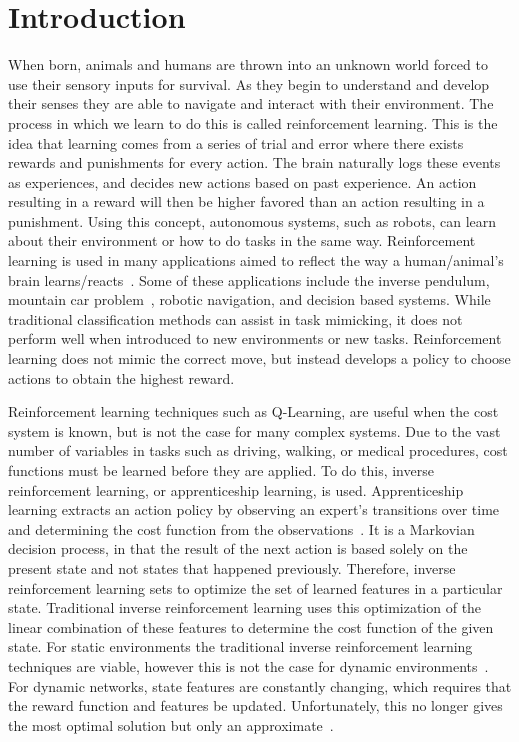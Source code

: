 \documentclass[12pt,american]{report}
\begin{document}
\chapter{Introduction}
When born, animals and humans are thrown into an unknown world forced to use their sensory inputs for survival. As they begin to understand and develop their senses they are able to  navigate  and  interact  with  their  environment.  The  process  in which  we  learn  to  do  this  is  called  reinforcement  learning.  This is  the  idea  that  learning  comes  from  a  series  of  trial  and  error where  there  exists  rewards  and  punishments  for  every  action. The brain naturally logs these events as experiences, and decides new  actions  based  on  past  experience. An  action  resulting  in  a reward  will  then  be  higher  favored  than  an  action  resulting  in a  punishment.  Using  this  concept,  autonomous  systems,  such  as robots, can learn about their environment or how to do tasks in the same way. Reinforcement learning is used in many applications aimed to reflect the way a human/animal's brain learns/reacts~\cite{atari}.  Some of these applications include the inverse pendulum, mountain car problem~\cite{sutton1996generalization}, robotic navigation, and decision based systems.  While traditional classification methods can assist in task mimicking, it does not perform well when introduced to new environments or new tasks.  Reinforcement learning does not mimic the correct move, but instead develops a policy to choose actions to obtain the highest reward.

Reinforcement learning techniques such as Q-Learning, are useful when the cost system is known, but is not the case for many complex systems. Due to the vast number of variables in tasks such as driving, walking, or medical procedures, cost functions must be learned before they are applied.  To do this, inverse reinforcement learning, or apprenticeship learning, is used. Apprenticeship learning extracts an action policy by observing an expert's transitions over time and determining the cost function from the observations~\cite{ngoinverse}. It is a Markovian decision process, in that the result of the next action is based solely on the present state and not states that happened previously. Therefore, inverse reinforcement learning sets to optimize the set of learned features in a particular state. Traditional inverse reinforcement learning uses this optimization of the linear combination of these features to determine the cost function of the given state. For static environments the traditional inverse reinforcement learning techniques are viable, however this is not the case for dynamic environments~\cite{vasquez2014inverse}. For dynamic networks, state features are constantly changing, which requires that the reward function and features be updated.   Unfortunately, this no longer gives the most optimal solution but only an approximate~\cite{vasquez2014inverse}. 
\end{document}
